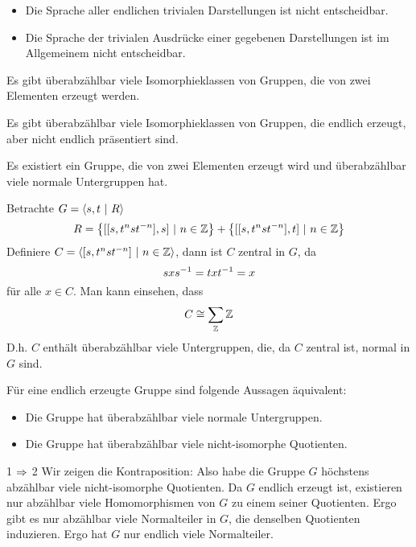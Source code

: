 \documentclass{article}
\begin{document}

\Bem{}
\begin{itemize}
\item Die Sprache aller endlichen trivialen Darstellungen ist nicht entscheidbar.
\item Die Sprache der trivialen Ausdrücke einer gegebenen Darstellungen ist im Allgemeinem nicht entscheidbar.
\end{itemize}

\Satz{}
Es gibt überabzählbar viele Isomorphieklassen von Gruppen, die von zwei Elementen erzeugt werden.

\Kor{}
Es gibt überabzählbar viele Isomorphieklassen von Gruppen, die endlich erzeugt, aber nicht endlich präsentiert sind.

\Prop{}
Es existiert ein Gruppe, die von zwei Elementen erzeugt wird und überabzählbar viele normale Untergruppen hat.
\begin{Beweis}{}
Betrachte $G = \grp{s,t}{R}$
\[ R = \set{[[s, t^nst^{-n}],s]}{n\in \Z} + \set{[[s, t^nst^{-n}],t]}{n\in \Z} \]
Definiere $C = \grp{[s, t^nst^{-n}]}{n \in \Z}$, dann ist $C$ zentral in $G$, da
\[sxs^{-1} = txt^{-1} = x \]
für alle $x \in C$. Man kann einsehen, dass
\[ C \overset{}{\cong} \sum_{\mathbb{Z}}\mathbb{Z} \]
D.h. $C$ enthält überabzählbar viele Untergruppen, die, da $C$ zentral ist, normal in $G$ sind.
\end{Beweis}

\Prop{}
Für eine endlich erzeugte Gruppe sind folgende Aussagen äquivalent:
\begin{itemize}
\item Die Gruppe hat überabzählbar viele normale Untergruppen.
\item Die Gruppe hat überabzählbar viele nicht-isomorphe Quotienten.
\end{itemize}
\begin{Beweis}{1 $\overset{}{\Rightarrow}$ 2}
Wir zeigen die Kontraposition: Also habe die Gruppe $G$ höchstens abzählbar viele nicht-isomorphe Quotienten. Da $G$ endlich erzeugt ist, existieren nur abzählbar viele Homomorphismen von $G$ zu einem seiner Quotienten. Ergo gibt es nur abzählbar viele Normalteiler in $G$, die denselben Quotienten induzieren. Ergo hat $G$ nur endlich viele Normalteiler.
\end{Beweis}


\newpage
\end{document}
